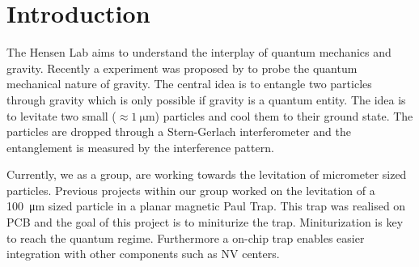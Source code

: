 \chapter{Introduction}
The Hensen Lab aims to understand the interplay of quantum mechanics and gravity. Recently a experiment was proposed by \citeauthor{bose_spin_2017} to probe the quantum mechanical nature of gravity. The central idea is to entangle two particles through gravity which is only possible if gravity is a quantum entity. The idea is to levitate two small ($\approx \qty{1}{\micro\meter}$) particles and cool them to their ground state. The particles are dropped through a Stern-Gerlach interferometer and the entanglement is measured by the interference pattern.

Currently, we as a group, are working towards the levitation of micrometer sized particles. Previous projects within our group worked on the levitation of a \qty{100}{\micro\meter} sized particle in a planar magnetic Paul Trap\cite{eli, mart}. This trap was realised on PCB and the goal of this project is to miniturize the trap. Miniturization is key to reach the quantum regime. Furthermore a on-chip trap enables easier integration with other components such as NV centers.
